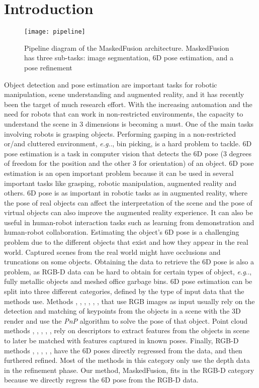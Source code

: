 \documentclass[runningheads]{llncs}
\makeatletter
\DeclareRobustCommand\onedot{\futurelet\@let@token\@onedot}
\def\@onedot{\ifx\@let@token.\else.\null\fi\xspace}
\def\eg{\emph{e.g}\onedot} \def\Eg{\emph{E.g}\onedot}
\makeatother
\begin{document}
\section{Introduction}
\begin{figure}[thpb]
   \centering
   \texttt{[image: pipeline]}
   \caption{Pipeline diagram of the MaskedFusion architecture. MaskedFusion has three sub-tasks: image segmentation, 6D pose estimation, and a pose refinement}
   \label{fig:digarch}
\end{figure}
Object detection and pose estimation are important tasks for robotic manipulation, scene understanding and augmented reality, and it has recently been the target of much research effort.
With the increasing automation and the need for robots that can work in non-restricted environments, the capacity to understand the scene in 3 dimensions is becoming a must.
One of the main tasks involving robots is grasping objects.
Performing gasping in a non-restricted or/and cluttered environment, \eg, bin picking, is a hard problem to tackle.
6D pose estimation is a task in computer vision that detects the 6D pose (3 degrees of freedom for the position and the other 3 for orientation) of an object.
6D pose estimation is an open important problem because it can be used in several important tasks like grasping, robotic manipulation, augmented reality and others.
6D pose is as important in robotic tasks as in augmented reality, where the pose of real objects can affect the interpretation of the scene and the pose of virtual objects can also improve the augmented reality experience.
It can also be useful in human-robot interaction tasks such as learning from demonstration and human-robot collaboration.
Estimating the object's 6D pose is a challenging problem due to the different objects that exist and how they appear in the real world.
Captured scenes from the real world might have occlusions and truncations on some objects.
Obtaining the data to retrieve the 6D pose is also a problem, as RGB-D data can be hard to obtain for certain types of object, \eg, fully metallic objects and meshed office garbage bins.
6D pose estimation can be split into three different categories, defined by the type of input data that the methods use.
Methods \cite{pnpex1}, \cite{deepex2}, \cite{pnpex2}, \cite{pvnet}, \cite{deepex1}, \cite{pnpex3}, \cite{pnpex4} that use RGB images as input usually rely on the detection and matching of keypoints from the objects in a scene with the 3D render and use the \textit{PnP} \cite{pnp} algorithm to solve the pose of that object.
Point cloud methods \cite{pvfh},  \cite{frustum}, \cite{pointnet}, \cite{fpfh}, \cite{vfh}, \cite{voxelnet} rely on descriptors to extract features from the objects in scene to later be matched with features captured in known poses.
Finally, RGB-D methods \cite{ssd6d}, \cite{localrgbd}, \cite{liunified}, \cite{densefusion}, \cite{posecnn}, \cite{pointfusion} have the 6D poses directly regressed from the data, and then furthered refined.
Most of the methods in this category only use the depth data in the refinement phase.
Our method, MaskedFusion, fits in the RGB-D category because we directly regress the 6D pose from the RGB-D data.
\end{document}
